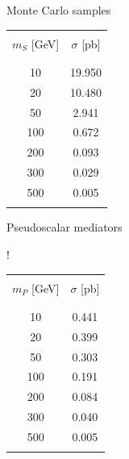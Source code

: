 \documentclass[8 pt]{beamer}
\begin{document}
\begin{frame}{Monte Carlo samples}
\begin{minipage}[c]{.22\linewidth}
\begin{table}
{\begin{tabular}{c|c}
& \\
$m_S$ [GeV] & $\sigma$ [pb] \\
& \\
 \hline \hline
 & \\
10 & 19.950 \\
20 & 10.480 \\
50 & 2.941 \\
100 & 0.672 \\
200 & 0.093 \\
300 & 0.029 \\
500 & 0.005 \\
& \\
\end{tabular}
}
\end{table} 	
   	\end{minipage} \hfill
	\begin{minipage}[c]{.22\linewidth}
	\begin{center}
	\begin{exampleblock}{} \begin{center} Pseudoscalar mediators \end{center} \end{exampleblock}
	\end{center}
	\vspace{-8pt}
\begin{table}
\centering
\resizebox{74pt} {!}{
\begin{tabular}{c|c}
& \\
$m_P$ [GeV] & $\sigma$ [pb] \\
& \\
 \hline \hline
 & \\
10 & 0.441 \\
20 & 0.399 \\
50 & 0.303 \\
100 & 0.191 \\
200 & 0.084 \\
300 & 0.040 \\
500 & 0.005 \\
& \\
\end{tabular}
}
\end{table} 	
   	\end{minipage} \hfill \vfill	
	
\end{frame}
\end{document}
